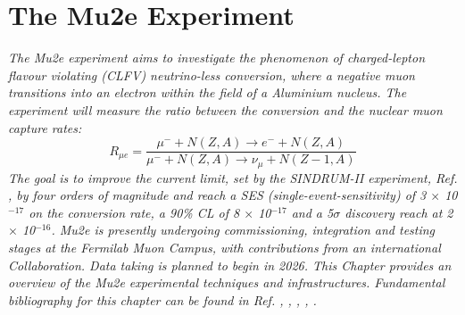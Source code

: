 \chapter{The Mu2e Experiment}\label{mu2echapter}
\textit{
The Mu2e experiment aims to investigate the phenomenon of charged-lepton flavour 
violating (CLFV) neutrino-less conversion, where a negative muon transitions into 
an electron within the field of a Aluminium nucleus. The experiment will measure 
the ratio between the conversion and the nuclear muon capture rates:
\begin{equation}\label{rmue}
R_{\mu e}=\frac{\mu^{-}+N(Z, A) \rightarrow e^{-}+N(Z, A)}{\mu^{-}+N(Z, A) \rightarrow \nu_\mu+N(Z-1, A)}
\end{equation}
The goal is to improve the current limit, set by the SINDRUM-II experiment, 
Ref. \cite{SINDRUMII:2006dvw}, by
four orders of magnitude and reach a SES (single-event-sensitivity) of 3 $\times$ 
10$^{-17}$ on the
conversion rate, a 90\% CL of 8 $\times$ 10$^{-17}$ and a 5$\sigma$ discovery 
reach at 2 $\times$ 10$^{-16}$.
Mu2e is presently undergoing commissioning, integration and testing stages at the 
Fermilab Muon Campus, 
with contributions from an international Collaboration. Data taking is planned to 
begin in 2026. 
This Chapter provides an overview of the Mu2e experimental techniques and infrastructures. 
Fundamental bibliography for this chapter can be found in Ref. \cite{bartoszek2015mu2e}, 
\cite{bobbb}, \cite{Bernstein_2013}, \cite{Kargiantoulakis_2020}, \cite{universe9010054}.}
